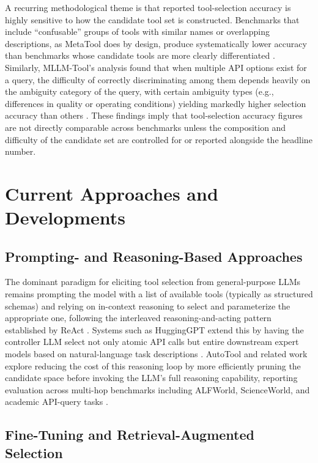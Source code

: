 \documentclass[acmsmall]{acmart}
\begin{document}
A recurring methodological theme is that reported tool-selection accuracy is highly sensitive to how the candidate tool set is constructed. Benchmarks that include ``confusable'' groups of tools with similar names or overlapping descriptions, as MetaTool does by design, produce systematically lower accuracy than benchmarks whose candidate tools are more clearly differentiated \citep{huang2024metatool}. Similarly, MLLM-Tool's analysis found that when multiple API options exist for a query, the difficulty of correctly discriminating among them depends heavily on the ambiguity category of the query, with certain ambiguity types (e.g., differences in quality or operating conditions) yielding markedly higher selection accuracy than others \citep{wang2025mllmtool}. These findings imply that tool-selection accuracy figures are not directly comparable across benchmarks unless the composition and difficulty of the candidate set are controlled for or reported alongside the headline number.

\section{Current Approaches and Developments}
\label{sec:approaches}

\subsection{Prompting- and Reasoning-Based Approaches}
\label{sec:prompting}

The dominant paradigm for eliciting tool selection from general-purpose LLMs remains prompting the model with a list of available tools (typically as structured schemas) and relying on in-context reasoning to select and parameterize the appropriate one, following the interleaved reasoning-and-acting pattern established by ReAct \citep{yao2023react}. Systems such as HuggingGPT extend this by having the controller LLM select not only atomic API calls but entire downstream expert models based on natural-language task descriptions \citep{shen2023hugginggpt}. AutoTool and related work explore reducing the cost of this reasoning loop by more efficiently pruning the candidate space before invoking the LLM's full reasoning capability, reporting evaluation across multi-hop benchmarks including ALFWorld, ScienceWorld, and academic API-query tasks \citep{jia2025autotool}.

\subsection{Fine-Tuning and Retrieval-Augmented Selection}
\label{sec:retrieval}
\end{document}
